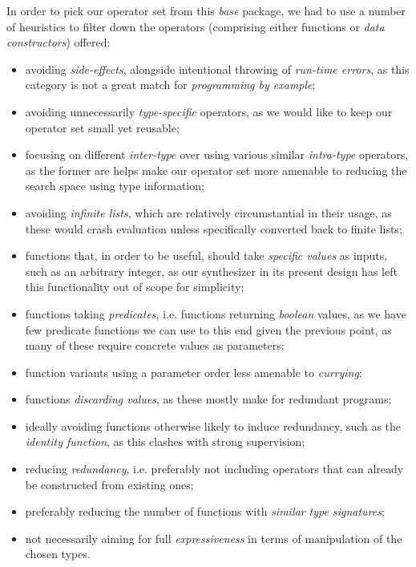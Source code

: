 \documentclass{article}
\begin{document}
In order to pick our operator set from this \emph{base} package,
we had to use a number of heuristics to filter down the operators (comprising either functions or \emph{data constructors}) offered:
\begin{itemize}
    \item avoiding \emph{side-effects}, alongside intentional throwing of \emph{run-time errors}, as this category is not a great match for \emph{programming by example};
    \item avoiding unnecessarily \emph{type-specific} operators, as we would like to keep our operator set small yet reusable;
    \item focusing on different \emph{inter-type} over using various similar \emph{intra-type} operators, as the former are helps make our operator set more amenable to reducing the search space using type information;
    \item avoiding \emph{infinite lists}, which are relatively circumstantial in their usage, as these would crash evaluation unless specifically converted back to finite lists;
    \item functions that, in order to be useful, should take \emph{specific values} as inputs, such as an arbitrary integer, as our synthesizer in its present design has left this functionality out of scope for simplicity;
    \item functions taking \emph{predicates}, i.e. functions returning \emph{boolean} values, as we have few predicate functions we can use to this end given the previous point, as many of these require concrete values as parameters;
    \item function variants using a parameter order less amenable to \emph{currying};
    \item functions \emph{discarding values}, as these mostly make for redundant programs;
    \item ideally avoiding functions otherwise likely to induce redundancy, such as the \emph{identity function}, as this clashes with strong supervision;
    \item reducing \emph{redundancy}, i.e. preferably not including operators that can already be constructed from existing ones;
    \item preferably reducing the number of functions with \emph{similar type signatures};
    \item not necessarily aiming for full \emph{expressiveness} in terms of manipulation of the chosen types.
\end{itemize}
\end{document}
